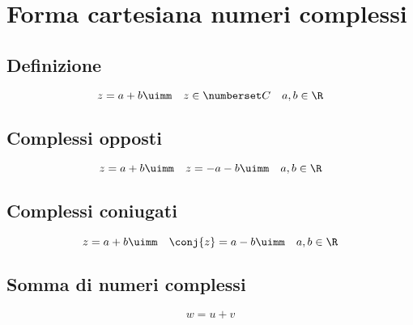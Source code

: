 \chapter{Forma cartesiana numeri complessi}
\section{Definizione}
\begin{equation*}
z=a+b\uimm\quad z\in\Co\quad a,b\in\R
\end{equation*} 
\begin{center}
	
\end{center}
\section{Complessi opposti}
\begin{equation*}
z=a+b\uimm\quad\-z=-a-b\uimm\quad a,b\in\R
\end{equation*}
\begin{center}
	
\end{center}
\section{Complessi coniugati}
\begin{equation*}
z=a+b\uimm\quad\conj{z}=a-b\uimm\quad a,b\in\R
\end{equation*}
\begin{center}
	
\end{center}
\section{Somma di numeri complessi}
\begin{equation*}
w=u+v
\end{equation*}
\begin{center}
	
\end{center}